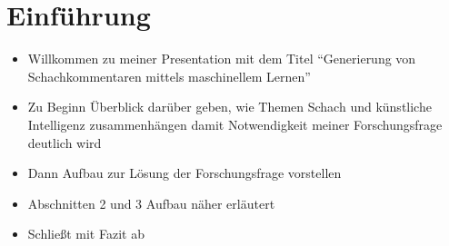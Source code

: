 \section{Einführung}

\begin{itemize}[leftmargin=*]
\item Willkommen zu meiner Presentation mit dem Titel ``Generierung von Schachkommentaren mittels maschinellem Lernen''
\item Zu Beginn Überblick darüber geben, wie Themen Schach und künstliche Intelligenz zusammenhängen damit Notwendigkeit meiner Forschungsfrage deutlich wird
\item Dann Aufbau zur Lösung der Forschungsfrage vorstellen
\item Abschnitten 2 und 3 Aufbau näher erläutert
\item Schließt mit Fazit ab
\end{itemize}